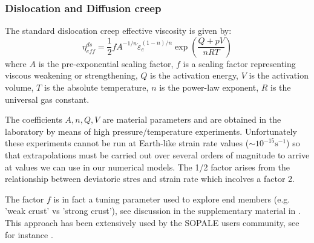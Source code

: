 \subsubsection{Dislocation and Diffusion creep}

The standard dislocation creep effective viscosity is given by:
\[
\eta_{eff}^{ds} = \frac{1}{2} f A^{-1/n} \dot{\varepsilon}_{e}^{(1-n)/n} \exp \left( \frac{Q+pV}{nRT}  \right)
\] 
where $A$ is the pre-exponential scaling factor, $f$ is a scaling factor
representing viscous weakening or strengthening, $Q$ is the activation energy, 
$V$ is the activation volume, $T$ is the absolute temperature, $n$ is the power-law 
exponent, $R$ is the universal gas constant. 

The coefficients $A,n,Q,V$ are material parameters and are obtained in the laboratory 
by means of high pressure/temperature experiments\cite{kawu93}. Unfortunately 
these experiments cannot be run at Earth-like strain rate values ($\sim 10^{-15}\text{s}^{-1}$)
so that extrapolations must be carried out over several orders of magnitude to 
arrive at values we can use in our numerical models. 
The 1/2 factor arises from the relationship between deviatoric stres and strain rate which 
incolves a factor 2.

The factor $f$ is in fact a tuning parameter used to explore end members (e.g. 'weak crust' 
vs 'strong crust'), see discussion in the supplementary material in \cite{hube11}. 
This approach has been extensively used by the SOPALE users community, see 
for instance \cite{wabj08,wabj08b,wabj08c,grpy12}.

